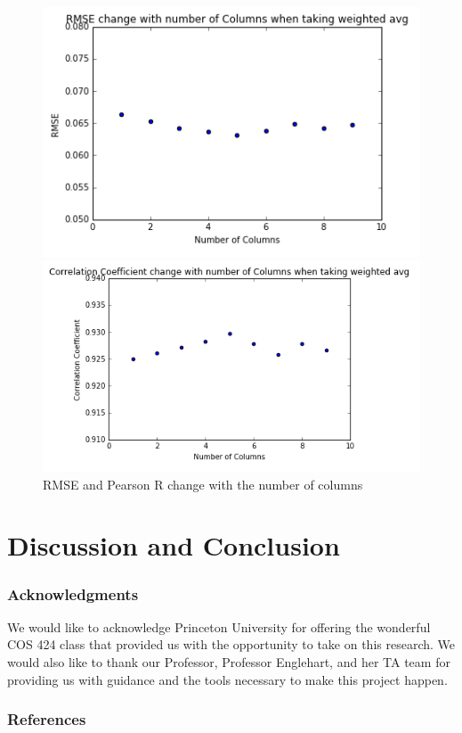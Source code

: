 \documentclass{article} %
\begin{document}
\begin{figure}[!ht]
\begin{center}
\caption{RMSE and Pearson R change with the number of columns}
\begin{minipage}[b]{0.40\linewidth}
	\includegraphics[scale=0.3]{RMSEWeightedMeanOpt.png}
\end{minipage}
\quad
\begin{minipage}[b]{0.40\linewidth}
	\includegraphics[scale=0.3]{CorrelationWeightedMeanOpt.png}
\end{minipage}
\end{center}
\end{figure}

\section{Discussion and Conclusion}

\subsubsection*{Acknowledgments}
We would like to acknowledge Princeton University for offering the wonderful COS 424 class that provided us with the opportunity to take on this research. We would also like to thank our Professor, Professor Englehart, and her TA team for providing us with guidance and the tools necessary to make this project happen.


\subsubsection*{References}
\end{document}
